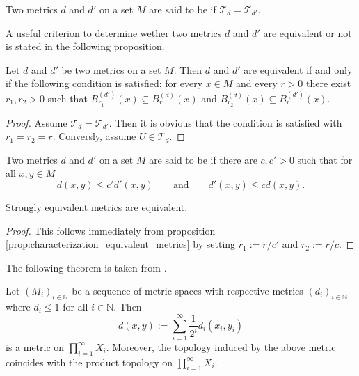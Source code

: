 \begin{definition}
	Two metrics $d$ and $d'$ on a set $M$ are said to be  if $\mathcal{T}_d = \mathcal{T}_{d'}$.
\end{definition}

A useful criterion to determine wether two metrics $d$ and $d'$ are equivalent or not is stated in the following proposition.

\begin{proposition}
	Let $d$ and $d'$ be two metrics on a set $M$. Then $d$ and $d'$ are equivalent if and only if the following condition is satisfied: for every $x \in M$ and every $r > 0$ there exist $r_1,r_2 > 0$ such that $B_{r_1}^{(d')}(x) \subseteq B_r^{(d)}(x)$ and $B_{r_2}^{(d)}(x) \subseteq B_r^{(d')}(x)$. 
	\label{prop:characterization_equivalent_metrics}
\end{proposition}

\begin{proof}
	Assume $\mathcal{T}_d = \mathcal{T}_{d'}$. Then it is obvious that the condition is satisfied with $r_1 = r_2 = r$. Conversly, assume $U \in \mathcal{T}_d$.	
\end{proof}

\begin{definition}
	Two metrics $d$ and $d'$ on a set $M$ are said to be  if there are $c, c' > 0$ such that for all $x,y \in M$ 
	\begin{equation}
		d(x,y) \leq c' d'(x,y) \qquad \text{and} \qquad d'(x,y) \leq c d(x,y).
	\end{equation}
\end{definition}

\begin{corollary}
	Strongly equivalent metrics are equivalent.
\end{corollary}

\begin{proof}
	This follows immediately from proposition \ref{prop:characterization_equivalent_metrics} by setting $r_1 := r/c'$ and $r_2 := r/c$.
\end{proof}

The following theorem is taken from \cite[259]{engelking:general_topology:1989}.

\begin{theorem}
	Let $(M_i)_{i \in \mathbb{N}}$ be a sequence of metric spaces with respective metrics $(d_i)_{i \in \mathbb{N}}$ where $d_i \leq 1$ for all $i \in \mathbb{N}$. Then 
	\begin{equation}
		d(x,y) := \sum_{i = 1}^\infty \frac{1}{2^i}d_i(x_i,y_i)
	\end{equation}
	\noindent is a metric on $\prod_{i = 1}^\infty X_i$. Moreover, the topology induced by the above metric coincides with the product topology on $\prod_{i = 1}^\infty X_i$.
	\label{thm:product_metric}
\end{theorem}

